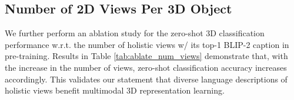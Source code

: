 \documentclass[10pt,twocolumn,letterpaper]{article}
\begin{document}





\subsection{Number of 2D Views Per 3D Object}
We further perform an ablation study for the zero-shot 3D classification performance w.r.t. the number of holistic views w/ its top-1 BLIP-2 caption in pre-training. Results in Table \ref{tab:ablate_num_views} demonstrate that, with the increase in the number of views, zero-shot classification accuracy increases accordingly. This validates our statement that diverse language descriptions of holistic views benefit multimodal 3D representation learning.

\end{document}
